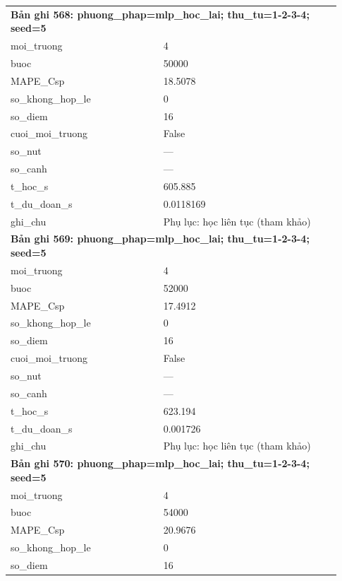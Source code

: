 \begin{longtable}{p{0.43\linewidth}p{0.50\linewidth}}
\midrule
\multicolumn{2}{p{0.95\linewidth}}{\textbf{Bản ghi 568: phuong\_phap=mlp\_hoc\_lai; thu\_tu=1-2-3-4; seed=5}} \\
moi\_\allowbreak truong & 4 \\
buoc & 50000 \\
MAPE\_\allowbreak Csp & 18.5078 \\
so\_\allowbreak khong\_\allowbreak hop\_\allowbreak le & 0 \\
so\_\allowbreak diem & 16 \\
cuoi\_\allowbreak moi\_\allowbreak truong & False \\
so\_\allowbreak nut & — \\
so\_\allowbreak canh & — \\
t\_\allowbreak hoc\_\allowbreak s & 605.885 \\
t\_\allowbreak du\_\allowbreak doan\_\allowbreak s & 0.0118169 \\
ghi\_\allowbreak chu & Phụ lục: học liên tục (tham khảo) \\
\midrule
\multicolumn{2}{p{0.95\linewidth}}{\textbf{Bản ghi 569: phuong\_phap=mlp\_hoc\_lai; thu\_tu=1-2-3-4; seed=5}} \\
moi\_\allowbreak truong & 4 \\
buoc & 52000 \\
MAPE\_\allowbreak Csp & 17.4912 \\
so\_\allowbreak khong\_\allowbreak hop\_\allowbreak le & 0 \\
so\_\allowbreak diem & 16 \\
cuoi\_\allowbreak moi\_\allowbreak truong & False \\
so\_\allowbreak nut & — \\
so\_\allowbreak canh & — \\
t\_\allowbreak hoc\_\allowbreak s & 623.194 \\
t\_\allowbreak du\_\allowbreak doan\_\allowbreak s & 0.001726 \\
ghi\_\allowbreak chu & Phụ lục: học liên tục (tham khảo) \\
\midrule
\multicolumn{2}{p{0.95\linewidth}}{\textbf{Bản ghi 570: phuong\_phap=mlp\_hoc\_lai; thu\_tu=1-2-3-4; seed=5}} \\
moi\_\allowbreak truong & 4 \\
buoc & 54000 \\
MAPE\_\allowbreak Csp & 20.9676 \\
so\_\allowbreak khong\_\allowbreak hop\_\allowbreak le & 0 \\
so\_\allowbreak diem & 16 \\

\end{longtable}
